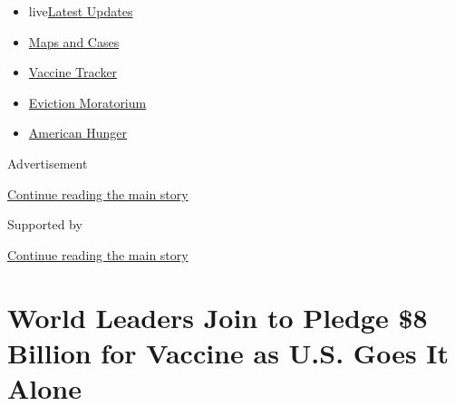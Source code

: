 \begin{itemize}
\tightlist
\item
  live\href{https://www.nytimes3xbfgragh.onion/2020/09/05/world/coronavirus-covid.html?name=styln-coronavirus-national\&region=TOP_BANNER\&block=storyline_menu_recirc\&action=click\&pgtype=Article\&impression_id=57bb2721-efba-11ea-a451-8f437b65897e\&variant=undefined}{Latest
  Updates}
\item
  \href{https://www.nytimes3xbfgragh.onion/interactive/2020/us/coronavirus-us-cases.html?name=styln-coronavirus-national\&region=TOP_BANNER\&block=storyline_menu_recirc\&action=click\&pgtype=Article\&impression_id=57bb4e30-efba-11ea-a451-8f437b65897e\&variant=undefined}{Maps
  and Cases}
\item
  \href{https://www.nytimes3xbfgragh.onion/interactive/2020/science/coronavirus-vaccine-tracker.html?name=styln-coronavirus-national\&region=TOP_BANNER\&block=storyline_menu_recirc\&action=click\&pgtype=Article\&impression_id=57bb4e31-efba-11ea-a451-8f437b65897e\&variant=undefined}{Vaccine
  Tracker}
\item
  \href{https://www.nytimes3xbfgragh.onion/2020/09/02/your-money/eviction-moratorium-covid.html?name=styln-coronavirus-national\&region=TOP_BANNER\&block=storyline_menu_recirc\&action=click\&pgtype=Article\&impression_id=57bb4e32-efba-11ea-a451-8f437b65897e\&variant=undefined}{Eviction
  Moratorium}
\item
  \href{https://www.nytimes3xbfgragh.onion/interactive/2020/09/02/magazine/food-insecurity-hunger-us.html?name=styln-coronavirus-national\&region=TOP_BANNER\&block=storyline_menu_recirc\&action=click\&pgtype=Article\&impression_id=57bb4e33-efba-11ea-a451-8f437b65897e\&variant=undefined}{American
  Hunger}
\end{itemize}

Advertisement

\protect\hyperlink{after-top}{Continue reading the main story}

Supported by

\protect\hyperlink{after-sponsor}{Continue reading the main story}

\hypertarget{world-leaders-join-to-pledge-8-billion-for-vaccine-as-us-goes-it-alone}{%
\section{World Leaders Join to Pledge \$8 Billion for Vaccine as U.S.
Goes It
Alone}\label{world-leaders-join-to-pledge-8-billion-for-vaccine-as-us-goes-it-alone}}

